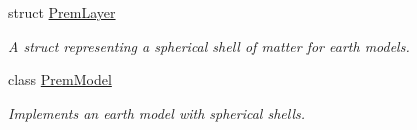 \begin{DoxyCompactItemize}
struct \hyperlink{structOscProb_1_1PremLayer}{Prem\+Layer}
\begin{DoxyCompactList}\small\item\em A struct representing a spherical shell of matter for earth models. \end{DoxyCompactList}\item 
class \hyperlink{classOscProb_1_1PremModel}{Prem\+Model}
\begin{DoxyCompactList}\small\item\em Implements an earth model with spherical shells. \end{DoxyCompactList}\end{DoxyCompactItemize}
